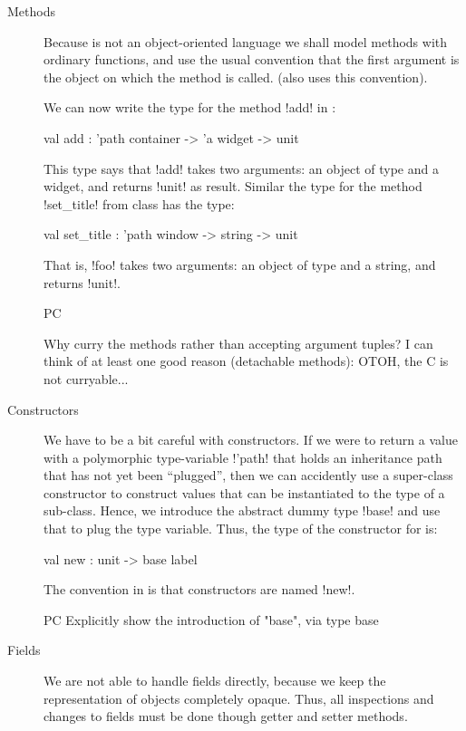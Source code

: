 \documentclass[workingdraft]{usetex-v1}
\begin{document}
\begin{description}
\item[Methods] Because \sml is not an object-oriented language we shall
  model methods with ordinary functions, and use the usual convention
  that the first argument is the object on which the method is called.
  (\gtk also uses this convention).
  
  We can now write the type for the method !add! in
  :
\begin{SMLcode}
val add : 'path container -> 'a widget 
                               -> unit
\end{SMLcode}
This type says that !add! takes two arguments: an object of type
 and a widget, and returns !unit! as result.
Similar the type for the method !set_title! from class
 has the type:
\begin{SMLcode}
val set_title : 'path window -> string 
                               -> unit
\end{SMLcode}
That is, !foo! takes two arguments: an object of type 
 and a string, and returns !unit!.

\begin{ednote}{PC}
  
Why curry the methods rather than accepting argument tuples?
I can think of at least one good reason (detachable
methods): OTOH, the C is not curryable...

\end{ednote}

\item[Constructors] We have to be a bit careful with constructors.  If
  we were to return a value with a polymorphic type-variable !'path!
  that holds an inheritance path that has not yet been ``plugged'',
  then we can accidently use a super-class constructor to construct
  values that can be instantiated to the type of a sub-class.  Hence,
  we introduce the abstract dummy type !base! and use that to plug the
  type variable.  Thus, the type of the constructor for
   is:
\begin{SMLcode}
val new : unit -> base label
\end{SMLcode}
The convention in \gtk is that constructors are named !new!.

\begin{ednote}{PC}
  Explicitly show the introduction of "base",
via
   type base
\end{ednote}


\item[Fields] We are not able to handle fields directly, because we
  keep the representation of objects completely opaque.  Thus, all
  inspections and changes to fields must be done though getter and
  setter methods.


\end{description}
\end{document}
